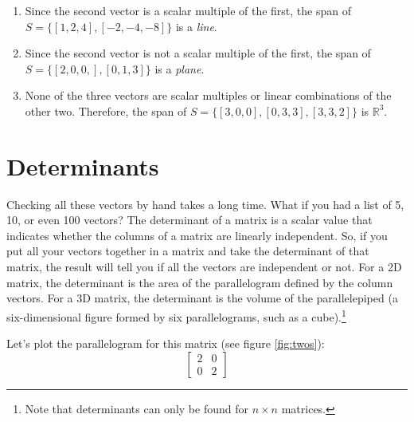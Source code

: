 \begin{Answer}[ref = span1]
\begin{enumerate}
\item Since the second vector is a scalar multiple of the first, the span of 
$S = \{ \left[1, 2, 4 \right], \left[-2, -4, -8 \right] \}$ is a \textit{line}.
\item Since the second vector is not a scalar multiple of the first, the span 
of $S = \{ \left[2, 0, 0, \right], \left[0, 1, 3 \right] \}$ is a 
\textit{plane}.
\item None of the three vectors are scalar multiples or linear combinations of 
the other two. Therefore, the span of $S = \{ \left[3, 0, 0 \right], \left[ 0, 
3, 3 \right], \left[3, 3, 2 \right] \}$ is $\mathbb{R}^3$.
\end{enumerate}
\end{Answer}


\section{Determinants}
Checking all these vectors by hand takes a long time. What if you had a list 
of 5, 10, or even 100 vectors? The determinant of a matrix is a scalar value 
that indicates whether the columns of a matrix are linearly independent. So, 
if you put all your vectors together in a matrix and take the determinant of 
that matrix, the result will tell you if all the vectors are independent or 
not. For a 2D matrix, the determinant is the area of the parallelogram defined 
by the column vectors. For a 3D matrix, the determinant is the volume of the 
parallelepiped (a six-dimensional figure formed by six parallelograms, such as 
a cube).\footnote{Note that determinants can only be found for $n \times n$ matrices.} 

Let's plot the parallelogram for this matrix (see figure \ref{fig:twos}):
$$
\begin{bmatrix}
2 & 0  \\
0 & 2 
\end{bmatrix}
$$

